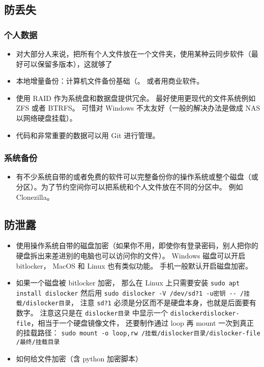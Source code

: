 
\begin{issues}
\issueDraft
\end{issues}

\subsection{防丢失}
\subsubsection{个人数据}
\begin{itemize}
\item 对大部分人来说，把所有个人文件放在一个文件夹，使用某种云同步软件（最好可以保留多版本），这就够了
\item 本地增量备份：计算机文件备份基础（。 或者用商业软件。
\item 使用 RAID 作为系统盘和数据盘提供冗余。 最好使用更现代的文件系统例如 ZFS 或者 BTRFS。 可惜对 Windows 不太友好（一般的解决办法是做成 NAS 以网络硬盘挂载）。
\item 代码和非常重要的数据可以用 Git 进行管理。
\end{itemize}

\subsubsection{系统备份}
\begin{itemize}
\item 有不少系统自带的或者免费的软件可以完整备份你的操作系统或整个磁盘（或分区）。为了节约空间你可以把系统和个人文件放在不同的分区中。 例如 Clonezilla。
\end{itemize}

\subsection{防泄露}
\begin{itemize}
\item 使用操作系统自带的磁盘加密（如果你不用，即使你有登录密码，别人把你的硬盘拆出来差进别的电脑也可以访问你的文件）。 Windows 磁盘可以开启 bitlocker， MacOS 和 Linux 也有类似功能。 手机一般默认开启磁盘加密。
\item 如果一个磁盘被 bitlocker 加密， 那么在 Linux 上只需要安装 \verb`sudo apt install dislocker` 然后用 \verb`sudo dislocker -V /dev/sd?1 -u密钥 -- /挂载/dislocker目录`， 注意 \verb`sd?1` 必须是分区而不是硬盘本身，也就是后面要有数字。  注意这只是在 \verb`dislocker目录` 中显示一个 \verb`dislockerdislocker-file`，相当于一个硬盘镜像文件， 还要制作通过 loop 再 mount 一次到真正的挂载路径： \verb`sudo mount -o loop,rw /挂载/dislocker目录/dislocker-file /最终/挂载目录`
\item 如何给文件加密（含 python 加密脚本）
\end{itemize}
